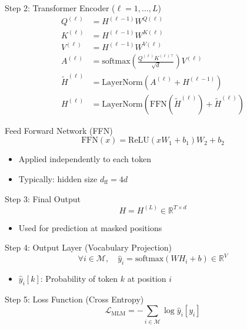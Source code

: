 \documentclass{beamer}
\begin{document}
	\begin{frame}{Step 2: Transformer Encoder ($\ell = 1, \dots, L$)}
		\[
		\begin{aligned}
			Q^{(\ell)} &= H^{(\ell-1)} W^{Q(\ell)} \\
			K^{(\ell)} &= H^{(\ell-1)} W^{K(\ell)} \\
			V^{(\ell)} &= H^{(\ell-1)} W^{V(\ell)} \\
			A^{(\ell)} &= \text{softmax}\left( \frac{Q^{(\ell)} K^{(\ell)\top}}{\sqrt{d}} \right) V^{(\ell)} \\
			\tilde{H}^{(\ell)} &= \text{LayerNorm}(A^{(\ell)} + H^{(\ell-1)}) \\
			H^{(\ell)} &= \text{LayerNorm}(\text{FFN}(\tilde{H}^{(\ell)}) + \tilde{H}^{(\ell)})
		\end{aligned}
		\]
	\end{frame}
	
	\begin{frame}{Feed Forward Network (FFN)}
		\[
		\text{FFN}(x) = \text{ReLU}(x W_1 + b_1) W_2 + b_2
		\]
		\begin{itemize}
			\item Applied independently to each token
			\item Typically: hidden size $d_{\text{ff}} = 4d$
		\end{itemize}
	\end{frame}
	
	\begin{frame}{Step 3: Final Output}
		\[
		H = H^{(L)} \in \mathbb{R}^{T \times d}
		\]
		\begin{itemize}
			\item Used for prediction at masked positions
		\end{itemize}
	\end{frame}
	
	\begin{frame}{Step 4: Output Layer (Vocabulary Projection)}
		\[
		\forall i \in \mathcal{M},\quad \hat{y}_i = \text{softmax}(W H_i + b) \in \mathbb{R}^V
		\]
		\begin{itemize}
			\item $\hat{y}_i[k]$: Probability of token $k$ at position $i$
		\end{itemize}
	\end{frame}
	
	\begin{frame}{Step 5: Loss Function (Cross Entropy)}
		\[
		\mathcal{L}_{\text{MLM}} = - \sum_{i \in \mathcal{M}} \log \hat{y}_i[y_i]
		\]
	\end{frame}
	
\end{document}
